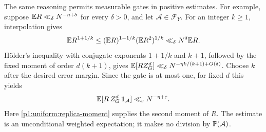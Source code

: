 The same reasoning permits measurable gates in
positive estimates. For example, suppose
\(\E R\ll_\delta N^{-\eta+\delta}\) for every
\(\delta>0\), and let \(\mathcal A\in\mathcal F_Y\).
For an integer \(k\ge1\), interpolation gives
\[
 \E R^{1+1/k}\le(\E R)^{1-1/k}(\E R^2)^{1/k}
       \ll_\delta N^\delta\E R.
\]
H\"older's inequality with conjugate exponents
\(1+1/k\) and \(k+1\), followed by the fixed
moment of order \(d(k+1)\), gives
\(\E[RZ_G^d]\ll_\delta
 N^{-\eta k/(k+1)+O(\delta)}\).
Choose \(k\) after the desired error margin.
Since the gate is at most one, for fixed \(d\) this yields
\[
 \E[R\,Z_G^d\,\ind_{\mathcal A}]
       \ll_\varepsilon N^{-\eta+\varepsilon}.
\]
Here \eqref{p1:uniform:replica-moment} supplies the
second moment of \(R\). The estimate is an
unconditional weighted expectation; it makes
no division by \(\P(\mathcal A)\).
